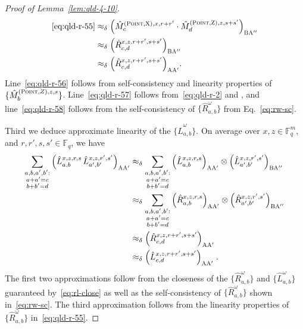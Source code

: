\documentclass[11pt]{article}
\theoremstyle{definition}
\newcommand{\F}{\ensuremath{\mathbb{F}}}
\newcommand{\labelstyle}[1]{\ensuremath{\textsc{#1}}\xspace}
\newcommand{\xpt}{\labelstyle{X}}
\newcommand{\zpt}{\labelstyle{Z}}
\newcommand{\alice}{\labelstyle{A}}
\newcommand{\bob}{\labelstyle{B}}
\newcommand{\typestyle}[1]{\ensuremath{\textsc{#1}}\xspace}
\newcommand{\Point}{\typestyle{Point}}
\begin{document}
\begin{proof}[Proof of Lemma~\ref{lem:qld-4-10}]
 \begin{align}
\text{\eqref{eq:qld-r-55}} &\approx_\delta \Big(\hat{M}^{(\Point,\xpt),x,r+r'}_{c} \cdot \hat{M}^{(\Point,\zpt),z,s+s'}_{d}  \Big)_{\bob \alice''} \label{eq:qld-r-56} \\
 &\approx_\delta \Big ( \hat{R}^{x,z,r+r',s+s'}_{c,d} \Big)_{\bob \alice''} \label{eq:qld-r-57} \\
 &\approx_\delta \Big ( \hat{R}^{x,z,r+r',s+s'}_{c,d} \Big)_{\alice \alice'} \label{eq:qld-r-58}.
	\end{align}	
Line~\eqref{eq:qld-r-56} follows from self-consistency and linearity properties of $\{ \hat{M}^{(\Point,Z),z,s}_b \}$. Line~\eqref{eq:qld-r-57} follows from~\eqref{eq:qld-r-2} and , and line~\eqref{eq:qld-r-58} follows from the self-consistency of $\{ \hat{R}^\omega_{a,b} \}$ from Eq.~\eqref{eq:rw-sc}. 
	
Third we deduce approximate linearity of the $\{ \hat{L}^\omega_{a,b} \}$. On average over $x,z \in \F_q^m$, and $r,r',s,s' \in \F_q$, we have
	\begin{align}
	\sum_{\substack{a,b,a',b': \\ a + a' = c \\ b + b' = d}}  \Big ( \hat{L}^{x,z,r,s}_{a,b} \, \hat{L}^{x,z,r',s'}_{a',b'} \Big)_{\alice \alice'} &\approx_\delta  \sum_{\substack{a,b,a',b': \\ a + a' = c \\ b + b' = d}} \Big( \hat{L}^{x,z,r,s}_{a,b} \Big)_{\alice \alice'} \otimes \Big (\hat{L}^{x,z,r',s'}_{a',b'} \Big)_{\bob \alice''}\notag \\
		&\approx_\delta  \sum_{\substack{a,b,a',b' : \\ a + a' = c \\ b + b' = d}}  \Big( \hat{R}^{x,z,r,s}_{a,b} \Big)_{\alice \alice'} \otimes \Big( \hat{R}^{x,z,r',s'}_{a',b'} \Big)_{\bob \alice''} \notag\\
		&\approx_\delta \Big ( \hat{R}^{x,z,r+r',s+s'}_{c,d} \Big)_{\alice \alice'} \notag\\
		&\approx_\delta \Big ( \hat{L}^{x,z,r+r',s+s'}_{c,d} \Big)_{\alice \alice'}\;.\label{eq:l-al}
	\end{align}
	The first two approximations follow from the closeness of the $\{ \hat{R}^\omega_{a,b} \}$ and $\{ \hat{L}^\omega_{a,b} \}$  guaranteed by~\eqref{eq:rl-close} as well as the self-consistency of $\{ \hat{R}^\omega_{a,b} \}$ shown in~\eqref{eq:rw-sc}. The third approximation follows from the linearity properties of $\{ \hat{R}^\omega_{a,b} \}$ in~\eqref{eq:qld-r-55}. 
	

\end{proof}
\end{document}
